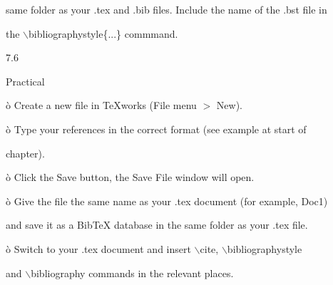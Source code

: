 \documentclass[a4paper,portrait,12pt]{article}
\begin{document}
\begin{flushleft}
same folder as your .tex and .bib files. Include the name of the .bst file in
\end{flushleft}


\begin{flushleft}
the \ensuremath{\backslash}bibliographystyle\{...\} commmand.
\end{flushleft}





7.6





\begin{flushleft}
Practical
\end{flushleft}





\begin{flushleft}
\`{o} Create a new file in TeXworks (File menu $>$ New).
\end{flushleft}


\begin{flushleft}
\`{o} Type your references in the correct format (see example at start of
\end{flushleft}


\begin{flushleft}
chapter).
\end{flushleft}


\begin{flushleft}
\`{o} Click the Save button, the Save File window will open.
\end{flushleft}


\begin{flushleft}
\`{o} Give the file the same name as your .tex document (for example, Doc1)
\end{flushleft}


\begin{flushleft}
and save it as a BibTeX database in the same folder as your .tex file.
\end{flushleft}


\begin{flushleft}
\`{o} Switch to your .tex document and insert \ensuremath{\backslash}cite, \ensuremath{\backslash}bibliographystyle
\end{flushleft}


\begin{flushleft}
and \ensuremath{\backslash}bibliography commands in the relevant places.
\end{flushleft}
\end{document}
